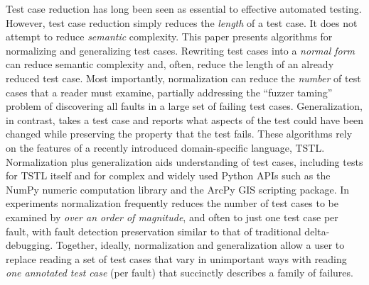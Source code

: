 Test case reduction has long been seen as essential to effective automated testing.  However, test case reduction simply reduces the \emph{length} of a test case.  It does not attempt to reduce \emph{semantic} complexity.  This paper presents algorithms for normalizing and generalizing test cases.  Rewriting test cases into a \emph{normal form} can reduce semantic complexity and, often, reduce the length of an already reduced test case.  Most importantly, normalization can reduce the \emph{number} of test cases that a reader must examine, partially addressing the ``fuzzer taming'' problem of discovering all faults in a large set of failing test cases.  Generalization, in contrast, takes a test case and reports what aspects of the test could have been changed while preserving the property that the test fails.  These algorithms rely on the features of a recently introduced domain-specific language, TSTL.  Normalization plus generalization aids understanding of test cases, including tests for TSTL itself and for complex and widely used Python APIs such as the NumPy numeric computation library and the ArcPy GIS scripting package.  In experiments normalization frequently reduces the number of test cases to be examined by \emph{over an order of magnitude}, and often to just one test case per fault, with fault detection preservation similar to that of traditional delta-debugging.  Together, ideally, normalization and generalization allow a user to replace reading a set of test cases that vary in unimportant ways with reading \emph{one annotated test case} (per fault) that succinctly describes a family of failures. 